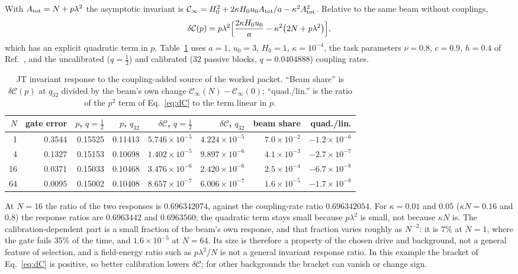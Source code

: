With $A_{\rm tot}=N+p\lambda^2$ the asymptotic invariant is $\mathcal C_\infty=H_0^2+2\kappa H_0u_0A_{\rm tot}/a-\kappa^2A_{\rm tot}^2$. Relative to the same beam without couplings,
\begin{equation}
\delta\mathcal C(p)=p\lambda^2\Bigl[\frac{2\kappa H_0u_0}a-\kappa^2\bigl(2N+p\lambda^2\bigr)\Bigr],
\label{eq:dC}
\end{equation}
which has an explicit quadratic term in $p$. Table~\ref{tab:response} uses $a=1$, $u_0=3$, $H_0=1$, $\kappa=10^{-4}$, the task parameters $\nu=0.8$, $c=0.9$, $h=0.4$ of Ref.~\cite{Liu2026QRAIFB}, and the uncalibrated ($q=\tfrac12$) and calibrated ($32$ passive blocks, $q=0.0404888$) coupling rates.

\begin{table}[ht]
\centering
\footnotesize
\setlength{\tabcolsep}{4pt}
\begin{tabular}{@{}rrrrrrrr@{}}
\toprule
$N$ & gate error & $p$, $q=\tfrac12$ & $p$, $q_{32}$ & $\delta\mathcal C$, $q=\tfrac12$ & $\delta\mathcal C$, $q_{32}$ & beam share & quad./lin.\\
\midrule
1 & 0.3544 & 0.15525 & 0.11413 & $5.746\times10^{-5}$ & $4.224\times10^{-5}$ & $7.0\times10^{-2}$ & $-1.2\times10^{-6}$\\
4 & 0.1327 & 0.15153 & 0.10698 & $1.402\times10^{-5}$ & $9.897\times10^{-6}$ & $4.1\times10^{-3}$ & $-2.7\times10^{-7}$\\
16 & 0.0371 & 0.15033 & 0.10468 & $3.476\times10^{-6}$ & $2.420\times10^{-6}$ & $2.5\times10^{-4}$ & $-6.7\times10^{-8}$\\
64 & 0.0095 & 0.15002 & 0.10408 & $8.657\times10^{-7}$ & $6.006\times10^{-7}$ & $1.6\times10^{-5}$ & $-1.7\times10^{-8}$\\
\bottomrule
\end{tabular}
\caption{JT invariant response to the coupling-added source of the worked packet. ``Beam share'' is $\delta\mathcal C(p)$ at $q_{32}$ divided by the beam's own change $\mathcal C_\infty(N)-\mathcal C_\infty(0)$; ``quad./lin.'' is the ratio of the $p^2$ term of Eq.~\eqref{eq:dC} to the term linear in $p$.}
\label{tab:response}
\end{table}

At $N=16$ the ratio of the two responses is $0.696342074$, against the coupling-rate ratio $0.696342054$. For $\kappa=0.01$ and $0.05$ ($\kappa N=0.16$ and $0.8$) the response ratios are $0.6963442$ and $0.6963560$; the quadratic term stays small because $p\lambda^2$ is small, not because $\kappa N$ is. The calibration-dependent part is a small fraction of the beam's own response, and that fraction varies roughly as $N^{-2}$: it is $7\%$ at $N=1$, where the gate fails $35\%$ of the time, and $1.6\times10^{-5}$ at $N=64$. Its size is therefore a property of the chosen drive and background, not a general feature of selection, and a field-energy ratio such as $p\lambda^2/N$ is not a general invariant response ratio. In this example the bracket of Eq.~\eqref{eq:dC} is positive, so better calibration lowers $\delta\mathcal C$; for other backgrounds the bracket can vanish or change sign.

